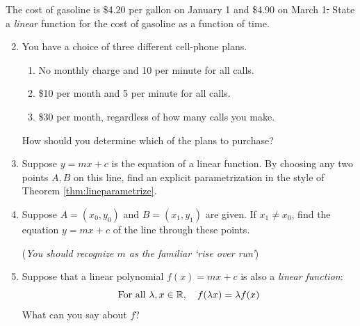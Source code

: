 \begin{exercises}{}{}
	\exstart The cost of gasoline is \$4.20 per gallon on January 1\st{} and \$4.90 on March 1\st. State a \emph{linear} function for the cost of gasoline as a function of time.
\begin{enumerate}\setcounter{enumi}{1}
  \item You have a choice of three different cell-phone plans.
  \begin{enumerate}
    \item No monthly charge and 10\textcent{} per minute for all calls.
    \item \$10 per month and 5\textcent{} per minute for all calls.
    \item \$30 per month, regardless of how many calls you make.
  \end{enumerate}
  How should you determine which of the plans to purchase?
    
    
    \item Suppose $y=mx+c$ is the equation of a linear function. By choosing any two points $A,B$ on this line, find an explicit parametrization in the style of Theorem \ref{thm:lineparametrize}.
    
    \item Suppose $A=(x_0,y_0)$ and $B=(x_1,y_1)$ are given. If $x_1\neq x_0$, find the equation $y=mx+c$ of the line through these points.\par
    (\emph{You should recognize $m$ as the familiar `rise over run'})
    
    
    \item Suppose that a linear polynomial $f(x)=mx+c$ is also a \emph{linear function}:
    \[\text{For all }\lambda,x\in\mathbb{R},\quad f(\lambda x)=\lambda f(x)\]
    What can you say about $f$?
  \end{enumerate}
\end{exercises}


